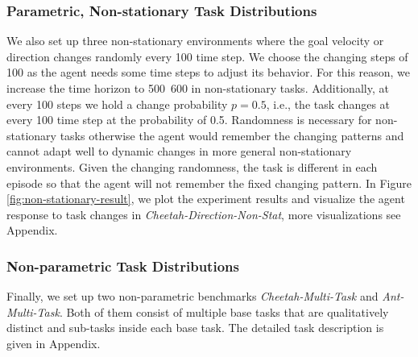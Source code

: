 \documentclass[letterpaper]{article} %
\begin{document}
\label{sec:non-stationary results}
\subsubsection{Parametric, Non-stationary Task Distributions} We also set up three non-stationary environments where the goal velocity or direction changes randomly every 100 time step. We choose the changing steps of 100 as the agent needs some time steps to adjust its behavior. For this reason, we increase the time horizon to 500~600 in non-stationary tasks. Additionally, at every 100 steps we hold a change probability $p=0.5$, i.e., the task changes at every 100 time step at the probability of 0.5. Randomness is necessary for non-stationary tasks otherwise the agent would remember the changing patterns and cannot adapt well to dynamic changes in more general non-stationary environments. Given the changing randomness, the task is different in each episode so that the agent will not remember the fixed changing pattern. In Figure \ref{fig:non-stationary-result}, we plot the experiment results and visualize the agent response to task changes in \emph{Cheetah-Direction-Non-Stat}, more visualizations see Appendix.





\subsubsection{Non-parametric Task Distributions} Finally, we set up two non-parametric benchmarks \emph{Cheetah-Multi-Task} and \emph{Ant-Multi-Task}. Both of them consist of multiple base tasks that are qualitatively distinct and sub-tasks inside each base task. The detailed task description is given in Appendix.
\end{document}
